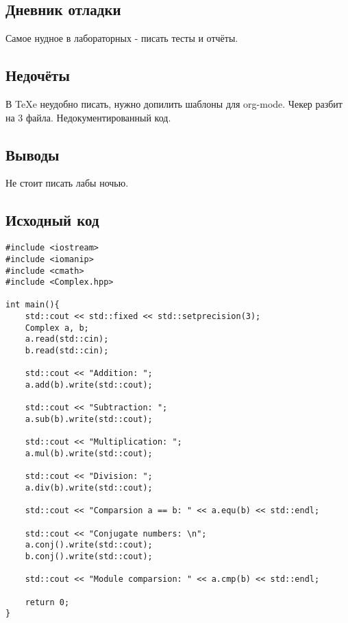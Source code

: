 \documentclass[12pt]{article}
\begin{document}
\subsection*{Дневник отладки}

Самое нудное в лабораторных - писать тесты и отчёты.

\subsection*{Недочёты}

В TeXe неудобно писать, нужно допилить шаблоны для org-mode.
Чекер разбит на 3 файла.
Недокументированный код.

\subsection*{Выводы}

Не стоит писать лабы ночью.

\vfill

\subsection*{Исходный код}

\begin{lstlisting}[label=some-code,caption={main.cpp}]
#include <iostream>
#include <iomanip>
#include <cmath>
#include <Complex.hpp>

int main(){
    std::cout << std::fixed << std::setprecision(3);
    Complex a, b;
    a.read(std::cin);
    b.read(std::cin);

    std::cout << "Addition: ";
    a.add(b).write(std::cout);

    std::cout << "Subtraction: ";
    a.sub(b).write(std::cout);

    std::cout << "Multiplication: ";
    a.mul(b).write(std::cout);

    std::cout << "Division: ";
    a.div(b).write(std::cout);

    std::cout << "Comparsion a == b: " << a.equ(b) << std::endl;

    std::cout << "Conjugate numbers: \n";
    a.conj().write(std::cout);
    b.conj().write(std::cout);

    std::cout << "Module comparsion: " << a.cmp(b) << std::endl;

    return 0;
} 

\end{lstlisting}
\pagebreak
\end{document}
